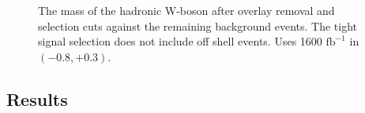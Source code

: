 \begin{figure}
   
     \caption{The  mass of the hadronic W-boson after overlay removal and selection cuts against the remaining background events. The tight signal selection does not include off shell events.  Uses 1600 $\text{fb}^{-1}$ in $(-0.8,+0.3)$. 
}
\label{fig:money}
\end{figure}

\subsection{Results}
\label{subsec:wmass}

